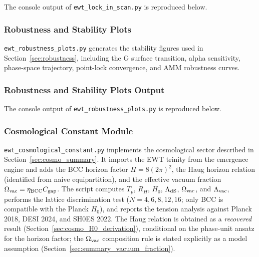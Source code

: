 \documentclass[10pt,a4paper]{article}
\begin{document}
The console output of \texttt{ewt\_lock\_in\_scan.py} is reproduced below.



\subsubsection{Robustness and Stability Plots}
\label{app:ewt_robustness_plots}

\texttt{ewt\_robustness\_plots.py} generates the stability figures used in Section~\ref{sec:robustness}, including the G surface transition, alpha sensitivity, phase-space trajectory, point-lock convergence, and AMM robustness curves.



\subsubsection{Robustness and Stability Plots Output}
\label{app:ewt_robustness_plots_output}

The console output of \texttt{ewt\_robustness\_plots.py} is reproduced below.



\subsubsection{Cosmological Constant Module}
\label{app:ewt_cosmological_constant}

\texttt{ewt\_cosmological\_constant.py} implements the cosmological
sector described in Section~\ref{sec:cosmo_summary}. It imports the
EWT trinity from the emergence engine and adds the BCC horizon factor
$H = 8(2\pi)^2$, the Haug horizon relation (identified from naive
equipartition), and the effective vacuum fraction
$\Omega_{\rm vac} = \eta_{\rm BCC} C_{\rm gap}$. The script computes
$T_p$, $R_H$, $H_0$, $\Lambda_{\rm dS}$, $\Omega_{\rm vac}$, and
$\Lambda_{\rm vac}$, performs the lattice discrimination test
($N = 4, 6, 8, 12, 16$; only BCC is compatible with the Planck
$H_0$), and reports the tension analysis against Planck 2018,
DESI 2024, and SH0ES 2022. The Haug relation is obtained as a
\emph{recovered} result (Section~\ref{sec:cosmo_H0_derivation}),
conditional on the phase-unit ansatz for the horizon factor; the
$\Omega_{\rm vac}$ composition rule is stated explicitly as a model
assumption (Section~\ref{sec:summary_vacuum_fraction}).
\end{document}

